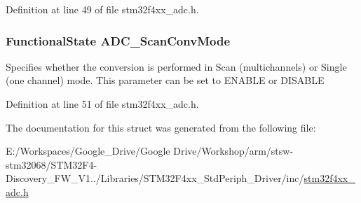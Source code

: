 Definition at line 49 of file stm32f4xx\-\_\-adc.\-h.

\hypertarget{struct_a_d_c___init_type_def_aa48a8ce21112f7262d5447bfe568e4b3}{
\subsubsection[{A\-D\-C\-\_\-\-Scan\-Conv\-Mode}]{\setlength{\rightskip}{0pt plus 5cm}Functional\-State A\-D\-C\-\_\-\-Scan\-Conv\-Mode}}\label{struct_a_d_c___init_type_def_aa48a8ce21112f7262d5447bfe568e4b3}
Specifies whether the conversion is performed in Scan (multichannels) or Single (one channel) mode. This parameter can be set to E\-N\-A\-B\-L\-E or D\-I\-S\-A\-B\-L\-E 

Definition at line 51 of file stm32f4xx\-\_\-adc.\-h.



The documentation for this struct was generated from the following file\-:\begin{DoxyCompactItemize}
\item 
E\-:/\-Workspaces/\-Google\-\_\-\-Drive/\-Google Drive/\-Workshop/arm/stsw-\/stm32068/\-S\-T\-M32\-F4-\/\-Discovery\-\_\-\-F\-W\-\_\-\-V1../\-Libraries/\-S\-T\-M32\-F4xx\-\_\-\-Std\-Periph\-\_\-\-Driver/inc/\hyperlink{stm32f4xx__adc_8h}{stm32f4xx\-\_\-adc.\-h}\end{DoxyCompactItemize}
